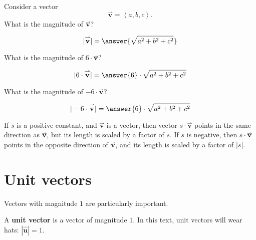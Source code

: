 \documentclass{ximera}
\begin{document}
\begin{question}
  Consider a vector
  \[
  \overset{\rightharpoonup}{\mathbf{v}} = \left\langle a,b,c \right\rangle.
  \]
  What is the magnitude of $\overset{\rightharpoonup}{\mathbf{v}}$?
  \begin{prompt}
    \[
    |\overset{\rightharpoonup}{\mathbf{v}}| = \answer{\sqrt{a^2+b^2+c^2}}
    \]
  \end{prompt}
  \begin{question}
    What is the magnitude of $6\cdot\overset{\rightharpoonup}{\mathbf{v}}$?
    \begin{prompt}
      \[
      |6\cdot\overset{\rightharpoonup}{\mathbf{v}}| = \answer{6}\cdot\sqrt{a^2+b^2+c^2}
      \]
    \end{prompt}
    \begin{question}
    What is the magnitude of $-6\cdot\overset{\rightharpoonup}{\mathbf{v}}$?
    \begin{prompt}
      \[
      |-6\cdot\overset{\rightharpoonup}{\mathbf{v}}| = \answer{6}\cdot\sqrt{a^2+b^2+c^2}
      \]
    \end{prompt}
    \begin{feedback}
      If $s$ is a positive constant, and $\overset{\rightharpoonup}{\mathbf{v}}$ is a vector, then
      vector $s\cdot\overset{\rightharpoonup}{\mathbf{v}}$ points in the same direction as
      $\overset{\rightharpoonup}{\mathbf{v}}$, but its length is scaled by a factor of $s$.  If $s$
      is negative, then $s\cdot\overset{\rightharpoonup}{\mathbf{v}}$ points in the opposite
      direction of $\overset{\rightharpoonup}{\mathbf{v}}$, and its length is scaled by a factor of
      $|s|$.
    \end{feedback}
  \end{question}
  \end{question}
\end{question}






\section{Unit vectors}

Vectors with magnitude $1$ are particularly important.

\begin{definition}
  A \textbf{unit vector} is a vector of magnitude $1$. In this text, unit
  vectors will wear hats: $|\mathbf{\hat{u}}|=1$.
\end{definition}
\end{document}
